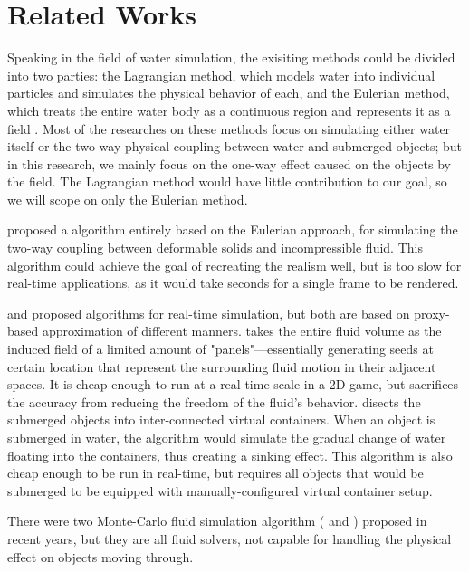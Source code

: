 \section{Related Works}

Speaking in the field of water simulation, the exisiting methods could be divided into two parties: the Lagrangian method, which models water into individual particles and simulates the physical behavior of each, and the Eulerian method, which treats the entire water body as a continuous region and represents it as a field \cite{GOU09}.
Most of the researches on these methods focus on simulating either water itself or the two-way physical coupling between water and submerged objects;
but in this research, we mainly focus on the one-way effect caused on the objects by the field.
The Lagrangian method would have little contribution to our goal, so we will scope on only the Eulerian method.

\cite{teng2016eulerian} proposed a algorithm entirely based on the Eulerian approach, for simulating the two-way coupling between deformable solids and incompressible fluid.
This algorithm could achieve the goal of recreating the realism well, but is too slow for real-time applications, as it would take seconds for a single frame to be rendered.

\cite{GER13} and \cite{BAJ20} proposed algorithms for real-time simulation, but both are based on proxy-based approximation of different manners.
\cite{GER13} takes the entire fluid volume as the induced field of a
limited amount of "panels"---essentially generating seeds at certain location that represent the surrounding fluid motion in their adjacent spaces.
It is cheap enough to run at a real-time scale in a 2D game, but sacrifices the accuracy from reducing the freedom of the fluid’s behavior.
\cite{BAJ20} disects the submerged objects into inter-connected virtual containers.
When an object is submerged in water, the algorithm would simulate the gradual change of water floating into the containers, thus creating a sinking effect.
This algorithm is also cheap enough to be run in real-time, but requires all objects that would be submerged to be equipped with manually-configured virtual container setup.

There were two Monte-Carlo fluid simulation algorithm (\cite{sugimoto2024velocity} and \cite{rioux2022monte}) proposed in recent years, but they are all fluid solvers, not capable for handling the physical effect on objects moving through.